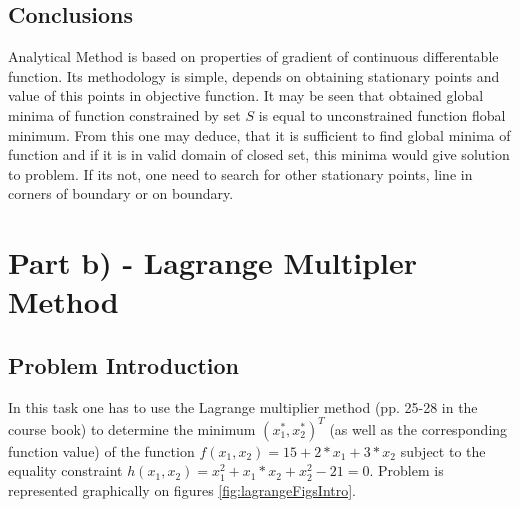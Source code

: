 \documentclass[main.tex]{subfiles}
\begin{document}
\newpage

\subsection{Conclusions}

Analytical Method is based on properties of gradient of continuous differentable function. Its methodology is simple, depends on obtaining stationary points and value of this points in objective function. It may be seen that obtained global minima of function constrained by set $S$ is equal to unconstrained function flobal minimum. From this one may deduce, that it is sufficient to find global minima of function and if it is in valid domain of closed set, this minima would give solution to problem. If its not, one need to search for other stationary points, line in corners of boundary or on boundary.

\newpage
\section{Part b) - Lagrange Multipler Method}

\subsection{Problem Introduction}

In this task one has to use the Lagrange multiplier method (pp. 25-28 in the course book) to determine the minimum $(x_1^{*},x_2^{*})^T$ (as well as the corresponding function value) of the function $f(x_1,x_2) = 15 + 2*x_1 + 3*x_2$ subject to the equality constraint $h(x_1,x_2) = x^2_1 + x_1*x_2 + x_2^2 - 21 = 0$. Problem is represented graphically on figures \ref{fig:lagrangeFigsIntro}.
\end{document}
